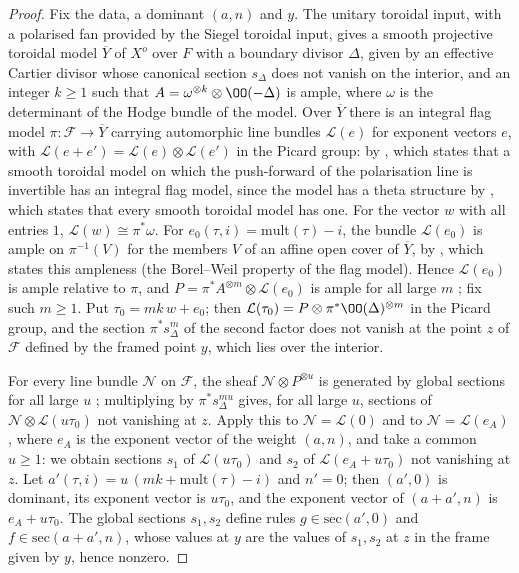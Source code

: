 \begin{proof}
Fix the data, a dominant $(a,n)$ and $y$. The unitary toroidal input, with a polarised fan provided by
the Siegel toroidal input, gives a smooth projective toroidal model $\overline Y$ of $X^o$ over $F$ with a
boundary divisor $\Delta$, given by an effective Cartier divisor whose canonical section $s_\Delta$ does not
vanish on the interior, and an integer $k\ge1$ such that $A=\omega^{\otimes k}\otimes\OO(-\Delta)$ is
ample, where $\omega$ is the determinant of the Hodge bundle of the model. Over $\overline Y$ there is an
integral flag model $\pi\colon\mathcal F\to\overline Y$ carrying automorphic line bundles $\mathcal L(e)$ for
exponent vectors $e$, with $\mathcal L(e+e')=\mathcal L(e)\otimes\mathcal L(e')$ in the Picard group: by
, which states that a
smooth toroidal model on which the push-forward of the polarisation line is invertible has an integral flag
model, since the model has a theta structure by
, which states that every smooth toroidal model has
one. For the vector $w$ with all entries $1$, $\mathcal L(w)\cong\pi^*\omega$. For
$e_0(\tau,i)=\mathrm{mult}(\tau)-i$, the bundle $\mathcal L(e_0)$ is ample on $\pi^{-1}(V)$ for the members
$V$ of an affine open cover of $\overline Y$, by
, which states this ampleness
(the Borel--Weil property of the flag model). Hence $\mathcal L(e_0)$ is ample relative to $\pi$, and
$P=\pi^*A^{\otimes m}\otimes\mathcal L(e_0)$ is ample for all large $m$ \cite[\S1.7]{Lazarsfeld2004};
fix such $m\ge1$. Put $\tau_0=mk\,w+e_0$; then $\mathcal L(\tau_0)=P\otimes\pi^*\OO(\Delta)^{\otimes m}$ in the
Picard group, and the section $\pi^*s_\Delta^m$ of the second factor does not vanish at the point $z$ of
$\mathcal F$ defined by the framed point $y$, which lies over the interior.

For every line bundle $\mathcal N$ on $\mathcal F$, the sheaf $\mathcal N\otimes P^{\otimes u}$ is generated by
global sections for all large $u$ \cite[Thm.~1.2.6]{Lazarsfeld2004}; multiplying by $\pi^*s_\Delta^{mu}$
gives, for all large $u$, sections of $\mathcal N\otimes\mathcal L(u\tau_0)$ not vanishing at $z$. Apply this
to $\mathcal N=\mathcal L(0)$ and to $\mathcal N=\mathcal L(e_A)$, where $e_A$ is the exponent vector of the
weight $(a,n)$, and take a common $u\ge1$: we obtain sections $s_1$ of $\mathcal L(u\tau_0)$ and $s_2$ of
$\mathcal L(e_A+u\tau_0)$ not vanishing at $z$. Let $a'(\tau,i)=u\,(mk+\mathrm{mult}(\tau)-i)$ and $n'=0$;
then $(a',0)$ is dominant, its exponent vector is $u\tau_0$, and the exponent vector of $(a+a',n)$ is
$e_A+u\tau_0$. The global sections $s_1,s_2$ define rules $g\in\mathrm{sec}(a',0)$ and
$f\in\mathrm{sec}(a+a',n)$, whose values at $y$ are the values of $s_1,s_2$ at $z$ in the frame given by $y$,
hence nonzero.
\end{proof}

